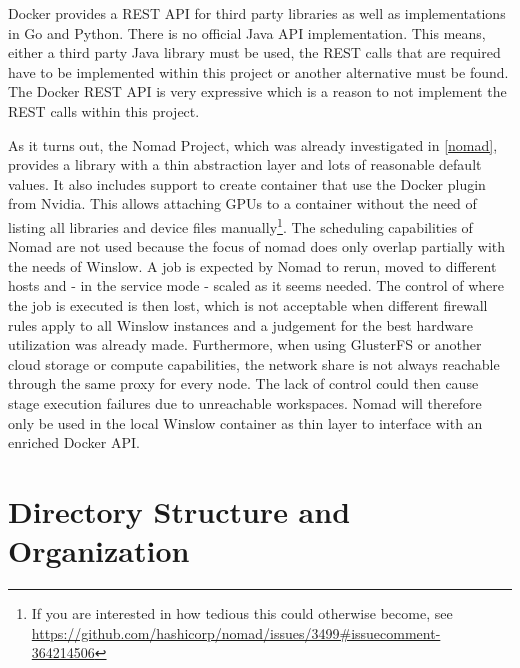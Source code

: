 Docker provides a REST API\cite{docker:api} for third party libraries as well as implementations in Go and Python.
There is no official Java API implementation.
This means, either a third party Java library must be used, the REST calls that are required have to be implemented within this project or another alternative must be found.
The Docker REST API is very expressive which is a reason to not implement the REST calls within this project.

As it turns out, the Nomad Project, which was already investigated in \autoref{nomad}, provides a library with a thin abstraction layer and lots of reasonable default values.
It also includes support to create container that use the Docker plugin from Nvidia\cite{nvidia:docker_plugin}.
This allows attaching GPUs to a container without the need of listing all libraries and device files manually\footnote{If you are interested in how tedious this could otherwise become, see \url{https://github.com/hashicorp/nomad/issues/3499\#issuecomment-364214506}}.
The scheduling capabilities of Nomad are not used because the focus of nomad does only overlap partially with the needs of Winslow.
A job is expected by Nomad to rerun, moved to different hosts and - in the service mode - scaled as it seems needed.
The control of where the job is executed is then lost, which is not acceptable when different firewall rules apply to all Winslow instances and a judgement for the best hardware utilization was already made.
Furthermore, when using GlusterFS or another cloud storage or compute capabilities, the network share is not always reachable through the same proxy for every node.
The lack of control could then cause stage execution failures due to unreachable workspaces.
Nomad will therefore only be used in the local Winslow container as thin layer to interface with an enriched Docker API.



\section{Directory Structure and Organization}


